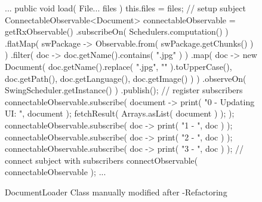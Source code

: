 \begin{figure}[p]
\begin{sourcecode}
\begin{javacode}{}
...
	public void load( File... files ) {
		this.files = files;
		// setup subject
		ConnectableObservable<Document> connectableObservable = getRxObservable()
				.subscribeOn( Schedulers.computation() )
				.flatMap( swPackage -> Observable.from( swPackage.getChunks() ) )
				.filter( doc -> doc.getName().contains( ".jpg" ) )
				.map( doc -> new Document(
						doc.getName().replace( ".jpg", "" ).toUpperCase(),
						doc.getPath(),
						doc.getLanguage(),
						doc.getImage() ) )
				.observeOn( SwingScheduler.getInstance() )
				.publish();
		// register subscribers
		connectableObservable.subscribe( document -> {
			print( "0 - Updating UI: ", document );
			fetchResult( Arrays.asList( document ) );
		} );
		connectableObservable.subscribe( doc -> print( "1 - ", doc ) );
		connectableObservable.subscribe( doc -> print( "2 - ", doc ) );
		connectableObservable.subscribe( doc -> print( "3 - ", doc ) );
		// connect subject with subscribers
		connectObservable( connectableObservable );
	}
...
\end{javacode}
\caption{DocumentLoader Class manually modified after \toolextension{}-Refactoring}
\label{code:example-edited}
\end{sourcecode}
\end{figure}
